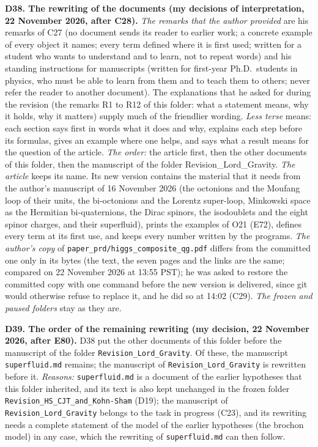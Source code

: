 \documentclass[
  10pt,
]{article}
\begin{document}
\textbf{D38. The rewriting of the documents (my decisions of
interpretation, 22 November 2026, after C28).} \emph{The remarks that
the author provided} are his remarks of C27 (no document sends its
reader to earlier work; a concrete example of every object it names;
every term defined where it is first used; written for a student who
wants to understand and to learn, not to repeat words) and his standing
instructions for manuscripts (written for first-year Ph.D.~students in
physics, who must be able to learn from them and to teach them to
others; never refer the reader to another document). The explanations
that he asked for during the revision (the remarks R1 to R12 of this
folder: what a statement means, why it holds, why it matters) supply
much of the friendlier wording. \emph{Less terse} means: each section
says first in words what it does and why, explains each step before its
formulas, gives an example where one helps, and says what a result means
for the question of the article. \emph{The order:} the article first,
then the other documents of this folder, then the manuscript of the
folder Revision\_Lord\_Gravity. \emph{The article} keeps its name. Its
new version contains the material that it needs from the author's
manuscript of 16 November 2026 (the octonions and the Moufang loop of
their units, the bi-octonions and the Lorentz super-loop, Minkowski
space as the Hermitian bi-quaternions, the Dirac spinors, the
isodoublets and the eight spinor charges, and their superfluid), prints
the examples of O21 (E72), defines every term at its first use, and
keeps every number written by the programs. \emph{The author's copy} of
\texttt{paper\_prd/higgs\_composite\_qg.pdf} differs from the committed
one only in its bytes (the text, the seven pages and the links are the
same; compared on 22 November 2026 at 13:55 PST); he was asked to
restore the committed copy with one command before the new version is
delivered, since git would otherwise refuse to replace it, and he did so
at 14:02 (C29). \emph{The frozen and paused folders} stay as they are.

\textbf{D39. The order of the remaining rewriting (my decision, 22
November 2026, after E80).} D38 put the other documents of this folder
before the manuscript of the folder \texttt{Revision\_Lord\_Gravity}. Of
these, the manuscript \texttt{superfluid.md} remains; the manuscript of
\texttt{Revision\_Lord\_Gravity} is rewritten before it. \emph{Reasons:}
\texttt{superfluid.md} is a document of the earlier hypotheses that this
folder inherited, and its text is also kept unchanged in the frozen
folder \texttt{Revision\_HS\_CJT\_and\_Kohn-Sham} (D19); the manuscript
of \texttt{Revision\_Lord\_Gravity} belongs to the task in progress
(C23), and its rewriting needs a complete statement of the model of the
earlier hypotheses (the brochon model) in any case, which the rewriting
of \texttt{superfluid.md} can then follow.
\end{document}
